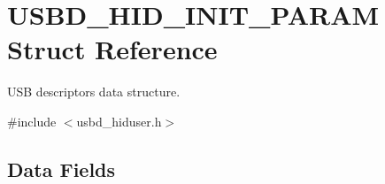 \hypertarget{structUSBD__HID__INIT__PARAM}{\section{U\-S\-B\-D\-\_\-\-H\-I\-D\-\_\-\-I\-N\-I\-T\-\_\-\-P\-A\-R\-A\-M Struct Reference}
\label{structUSBD__HID__INIT__PARAM}
}


U\-S\-B descriptors data structure.  




{\ttfamily \#include $<$usbd\-\_\-hiduser.\-h$>$}

\subsection*{Data Fields}
